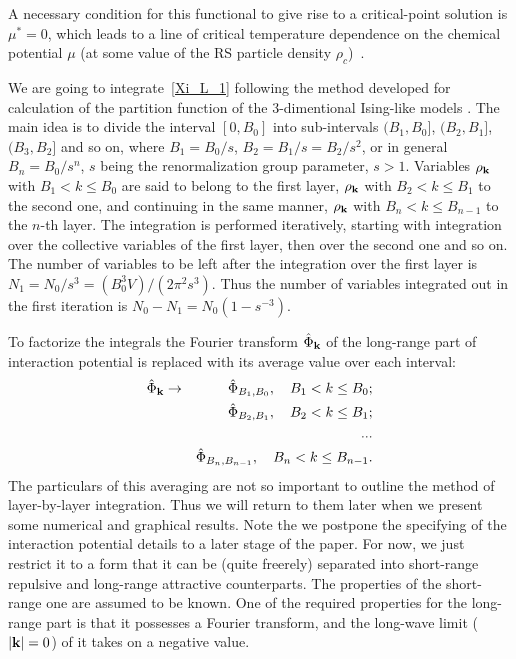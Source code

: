 A necessary condition for this functional to give rise to a critical-point solution is $\mu^* = 0$, which leads to a line of critical temperature dependence on the chemical potential $\mu$ (at some value of the RS particle density $\rho_c$)~\cite{RomaJPS2024}.

We are going to integrate~\eqref{Xi_L_1} following the method developed for calculation of the partition function of the 3-dimentional Ising-like models \cite{Yukh1989riv,Yukh2001book,MpkCMP2005}. The main idea is to divide the interval $[0, B_0]$ into sub-intervals $(B_1, B_0]$, $(B_2, B_1]$, $(B_3, B_2]$ and so on, where $B_1 = B_0/s$, $B_2 = B_1/s = B_2/s^2$, or in general $B_n = B_0/s^n$, $s$ being the renormalization group parameter, $s > 1.$ Variables $\rho_{\vb k}$ with $B_1 < k \leq B_0$ are said to belong to the first layer, $\rho_{\vb k}$ with $B_2 < k \leq B_1$ to the second one, and continuing in the same manner, $\rho_{\vb k}$ with $B_n < k \leq B_{n-1}$ to the $n$-th layer.
The integration is performed iteratively, starting with integration over the collective variables of the first layer, then over the second one and so on.
The number of variables to be left after the integration over the first layer is $N_1 = N_0 / s^3 = (B_0^3 V)/(2\pi^2 s^3)$. Thus the number of variables integrated out in the first iteration is $N_0 - N_1 = N_0(1-s^{-3})$.

To factorize the integrals the Fourier transform $\hat{\Phi}_{\vb k}$ of the long-range part of interaction potential is replaced with its average value over each interval:
\begin{eqnarray*}
	\hat{\Phi}_{\vb k} & \rightarrow & \hat{\Phi}_{B_1, B_0}, \quad B_1 < k \leq B_0;
	\\
	& & \hat{\Phi}_{B_2, B_1}, \quad B_2 < k \leq B_1;
	\\
	& & ...
	\\
	& & \hat{\Phi}_{B_n, B_{n-1}}, \quad B_n < k \leq B_{n-1}.
\end{eqnarray*}
The particulars of this averaging are not so important to outline the method of layer-by-layer integration. Thus we will return to them later when we present some numerical and graphical results.
Note the we postpone the specifying of the interaction potential details to a later stage of the paper. For now, we just restrict it to a form that it can be (quite freerely) separated into short-range repulsive and long-range attractive counterparts.
The properties of the short-range one are assumed to be known. One of the required properties for the long-range part is that it possesses a Fourier transform, and the long-wave limit ($\abs{\vb k} = 0$) of it takes on a negative value.

